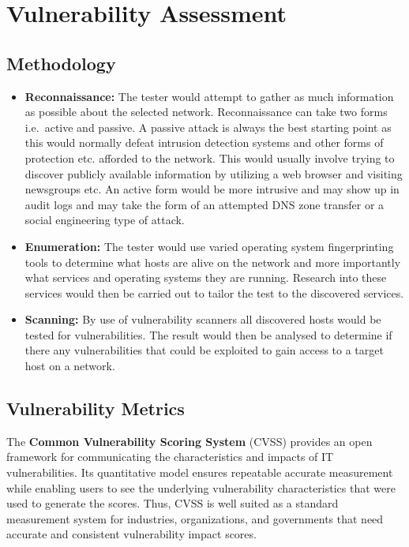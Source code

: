 

\chapter{Vulnerability Assessment}\label{ch:vulnass}

  \section{Methodology}\label{sec:methodology}

    \begin{itemize}
      \item \textbf{Reconnaissance:}
        The tester would attempt to gather as much information as possible about
        the selected network. Reconnaissance can take two forms i.e.~active and
        passive. A passive attack is always the best starting point as this
        would normally defeat intrusion detection systems and other forms of
        protection etc. afforded to the network. This would usually involve
        trying to discover publicly available information by utilizing a web
        browser and visiting newsgroups etc. An active form would be more
        intrusive and may show up in audit logs and may take the form of an
        attempted DNS zone transfer or a social engineering type of attack.
      \item \textbf{Enumeration:}
        The tester would use varied operating system fingerprinting tools to
        determine what hosts are alive on the network and more importantly what
        services and operating systems they are running. Research into these
        services would then be carried out to tailor the test to the discovered
        services.
      \item \textbf{Scanning:}
        By use of vulnerability scanners all discovered hosts would be tested
        for vulnerabilities. The result would then be analysed to determine if
        there any vulnerabilities that could be exploited to gain access to a
        target host on a network.
    \end{itemize}

  \section{Vulnerability Metrics}\label{sec:vulnerability-metrics}

    The \textbf{Common Vulnerability Scoring System} (CVSS) provides an open
    framework for communicating the characteristics and impacts of IT
    vulnerabilities. Its quantitative model ensures repeatable accurate
    measurement while enabling users to see the underlying vulnerability
    characteristics that were used to generate the scores. Thus, CVSS is
    well suited as a standard measurement system for industries,
    organizations, and governments that need accurate and consistent
    vulnerability impact scores.

